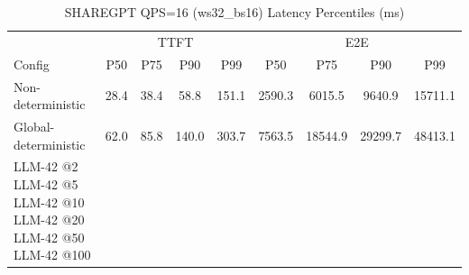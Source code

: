 \begin{table}[htbp]
\centering
\caption{SHAREGPT QPS=16 (ws32_bs16) Latency Percentiles (ms)}
\label{tab:sharegpt_qps16_ws32_bs16}
\begin{tabular}{l|cccc|cccc}
\toprule
& \multicolumn{4}{c|}{TTFT} & \multicolumn{4}{c}{E2E} \\
Config & P50 & P75 & P90 & P99 & P50 & P75 & P90 & P99 \\
\midrule
Non-deterministic & 28.4 & 38.4 & 58.8 & 151.1 & 2590.3 & 6015.5 & 9640.9 & 15711.1 \\
Global-deterministic & 62.0 & 85.8 & 140.0 & 303.7 & 7563.5 & 18544.9 & 29299.7 & 48413.1 \\
LLM-42 @2%
LLM-42 @5%
LLM-42 @10%
LLM-42 @20%
LLM-42 @50%
LLM-42 @100%
\bottomrule
\end{tabular}
\end{table}
